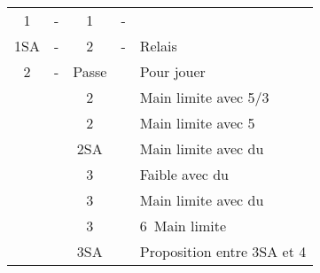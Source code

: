 \documentclass[a4paper, oneside, 11pt]{report}
\begin{document}
	\begin{tabular}{cccc|l}
	1\coeur & - & 1\pique & - &\\
	1SA & - & 2\trefle & - & Relais\\
	2\carreau & - & Passe && Pour jouer\\
	&& 2\coeur && Main limite avec 5\pique/3\coeur \\
	&& 2\pique && Main limite avec 5\pique\\
	&& 2SA && Main limite avec du \trefle\\
	&& 3\trefle && Faible avec du \trefle\\
	&& 3\carreau && Main limite avec du \carreau\\
	&& 3\pique && 6\pique\ Main limite\\
	&& 3SA && Proposition entre 3SA et 4\pique\\
	\end{tabular}\\\\
\end{document}
